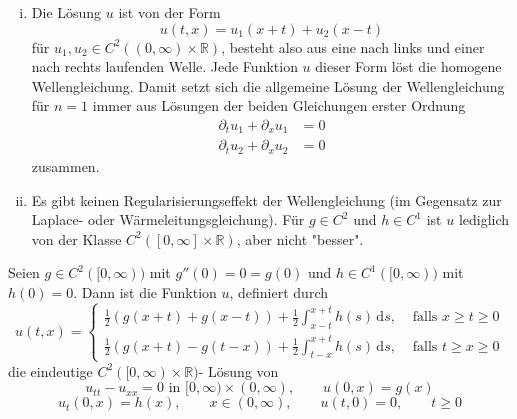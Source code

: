 \begin{bemerkung}
	\begin{enumerate}[(i)]
		\item Die Lösung $u$ ist von der Form
		\[
			u(t,x) = u_1(x+t) + u_2(x-t)
		\]
		für $u_1, u_2 \in C^2((0,\infty) \times \mathbb{R})$, besteht also aus eine nach links und einer nach rechts laufenden Welle. Jede Funktion $u$ dieser Form löst
		die homogene Wellengleichung. Damit setzt sich die allgemeine Lösung der Wellengleichung für $n=1$ immer aus Lösungen der beiden Gleichungen erster Ordnung 
		\begin{align*}
			\partial_t u_1 + \partial_x u_1 &= 0 \\
			\partial_t u_2 + \partial_x u_2 &= 0 
		\end{align*}
		zusammen.
		\item Es gibt keinen Regularisierungseffekt der Wellengleichung (im Gegensatz zur Laplace- oder Wärmeleitungsgleichung). Für $g \in C^2$ und $h \in C^1$ ist 
		$u$ lediglich von der Klasse $C^2([0, \infty] \times \mathbb{R})$, aber nicht "besser".
	\end{enumerate}
\end{bemerkung}
\begin{korollar}
	Seien $g \in C^2([0, \infty))$ mit $g''(0)=0 = g(0)$ und $h \in C^1([0,\infty))$ mit $h(0)=0$. Dann ist die Funktion $u$, definiert durch 
	\[
		u(t,x) = \begin{cases}
			\frac{1}{2}(g(x+t)+g(x-t)) + \frac{1}{2} \int_{x-t}^{x+t}h(s) \,\mathrm{d}s, &\text{ falls } x \geq t \geq 0\\
			\frac{1}{2}(g(x+t)-g(t-x)) + \frac{1}{2} \int_{t-x}^{x+t}h(s) \,\mathrm{d}s, &\text{ falls } t \geq x \geq 0
		\end{cases}
	\]
	die eindeutige $C^2([0,\infty) \times \mathbb{R})$- Lösung von 
	\[
		u_{tt}- u_{xx} = 0 \text{ in } [0, \infty) \times (0,\infty), \qquad u(0,x) = g(x)
	\]
	\[
		u_t(0,x) = h(x), \qquad x \in (0, \infty), \qquad u(t,0) = 0, \qquad t \geq 0
	\]
\end{korollar}
